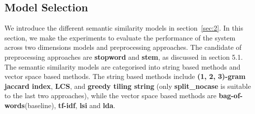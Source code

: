 \subsection{Model Selection}

We introduce the different semantic similarity models in section~\ref{sec:2}. In this section, we make the experiments to evaluate the performance of the system across two dimensions models and preprocessing approaches. The candidate of preprocessing approaches are \textbf{stopword} and \textbf{stem}, as discussed in section 5.1. The semantic similarity models are categorised into string based methods and vector space based methods. The string based methods include \textbf{(1, 2, 3)-gram jaccard index}, \textbf{LCS}, and \textbf{greedy tiling string} (only \textbf{split\_nocase} is suitable to the last two approaches), while the vector space based methods are \textbf{bag-of-words}(baseline), \textbf{tf-idf}, \textbf{lsi} and \textbf{lda}.


